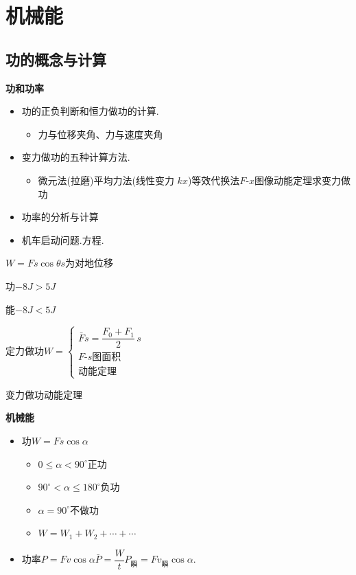 \chapter{机械能}
\label{ch:06}

\section{功的概念与计算}
\textbf{功和功率}
\begin{itemize}
\item 功的正负判断和恒力做功的计算.
  \begin{itemize}
  \item 力与位移夹角、力与速度夹角
  \end{itemize}
\item 变力做功的五种计算方法.
  \begin{itemize}
  \item 微元法(拉磨)\quad 平均力法(线性变力 $kx$)\quad 等效代换法\quad $F$-$x$图像\quad 动能定理求变力做功 %
  \end{itemize}
\item 功率的分析与计算
\item 机车启动问题.\quad 方程.
\end{itemize}

$W=Fs\cos\theta$\quad $s$为对地位移 %

功\quad $-8\unit{J}>5\unit{J}$

能\quad $-8\unit{J}<5\unit{J}$

定力做功\quad $W=\left\{\begin{array}{l}\bar{F}s=\dfrac{F_0+F_1}{2}\,s\\[4pt] \text{$F$-$s$图面积}\\[4pt] \text{动能定理}\end{array}\right.$ %

变力做功\quad 动能定理

\textbf{机械能}
\begin{itemize}
\item 功\quad $W=Fs\cos\alpha$
  \begin{itemize}
  \item $0\le\alpha<90^\circ$\quad 正功
  \item $90^\circ<\alpha\le180^\circ$\quad 负功
  \item $\alpha=90^\circ$\quad 不做功
  \item $W=W_1+W_2+\cdots+\cdots$ %
  \end{itemize}
\item 功率\quad $P=Fv\cos\alpha$\qquad $\bar{P}=\dfrac{W}{t}$\qquad $P_{\text{瞬}}=Fv_{\text{瞬}}\cos\alpha$.
\end{itemize}

